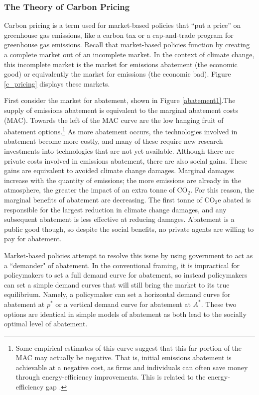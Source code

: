 \subsubsection{The Theory of Carbon Pricing}

Carbon pricing is a term used for market-based policies that ``put a price'' on greenhouse gas emissions, like a carbon tax or a cap-and-trade program for greenhouse gas emissions. Recall that market-based policies function by creating a complete market out of an incomplete market. In the context of climate change, this incomplete market is the market for emissions abatement (the economic good) or equivalently the market for emissions (the economic bad). Figure \ref{c_pricing} displays these markets. 

First consider the market for abatement, shown in Figure \ref{abatement1}.The supply of emissions abatement is equivalent to the marginal abatement costs (MAC). Towards the left of the MAC curve are the low hanging fruit of abatement options.\footnote{Some empirical estimates of this curve suggest that this far portion of the MAC may actually be negative. That is, initial emissions abatement is achievable at a negative cost, as firms and individuals can often save money through energy-efficiency improvements. This is related to the energy-efficiency gap \citep[see][]{allcott2012there, gerarden2017assessing}.} As more abatement occurs, the technologies involved in abatement become more costly, and many of these require new research investments into technologies that are not yet available. Although there are private costs involved in emissions abatement, there are also social gains. These gains are equivalent to avoided climate change damages. Marginal damages increase with the quantity of emissions; the more emissions are already in the atmosphere, the greater the impact of an extra tonne of CO$_2$. For this reason, the marginal benefits of abatement are decreasing. The first tonne of CO$_2$e abated is responsible for the largest reduction in climate change damages, and any subsequent abatement is less effective at reducing damages. Abatement is a public good though, so despite the social benefits, no private agents are willing to pay for abatement. 

Market-based policies attempt to resolve this issue by using government to act as a ``demander" of abatement. In the conventional framing, it is impractical for policymakers to set a full demand curve for abatement, so instead policymakers can set a simple demand curves that will still bring the market to its true equilibrium. Namely, a policymaker can set a horizontal demand curve for abatement at $p^*$ or a vertical demand curve for abatement at $A^*$. These two options are identical in simple models of abatement as both lead to the socially optimal level of abatement. 

